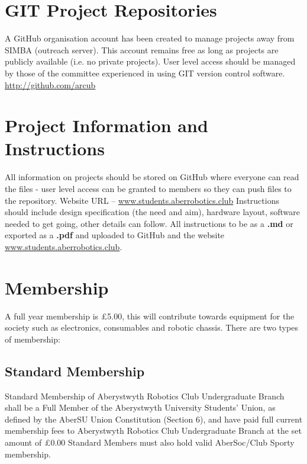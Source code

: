 \documentclass[a4paper,11pt]{article}
\begin{document}
\section{GIT Project Repositories}
A GitHub organisation account has been created to manage projects away from SIMBA (outreach server). This account remains free as long as projects are publicly available (i.e. no private projects). User level access should be managed by those of the committee experienced in using GIT version control software.\newline
\url{http://github.com/arcub}

\section{Project Information and Instructions}
All information on projects should be stored on GitHub where everyone can read the files - user level access can be granted to members so they can push files to the repository.\newline
Website URL – \url{www.students.aberrobotics.club}
Instructions should include design specification (the need and aim), hardware layout, software needed to get going, other details can follow.\newline
All instructions to be as a \textbf{.md} or exported as a \textbf{.pdf} and uploaded to GitHub and the website \url{www.students.aberrobotics.club}.

\section{Membership}
A full year membership is £5.00, this will contribute towards equipment for the society such as electronics, consumables and robotic chassis.
There are two types of membership:

\subsection{Standard Membership}
Standard Membership of Aberystwyth Robotics Club Undergraduate Branch shall be a Full Member of the Aberystwyth University Students’ Union, as defined by the AberSU Union Constitution (Section 6), and have paid full current membership fees to Aberystwyth Robotics Club Undergraduate Branch at the set amount of £0.00 Standard Members must also hold valid AberSoc/Club Sporty membership.

\newpage
\end{document}

